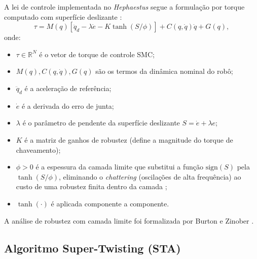 A lei de controle implementada no \textit{Hephaestus} segue a formulação por torque computado com superfície deslizante \cite{slotine1991applied}:
\begin{equation}
    \tau = M(q)\left[\ddot{q}_d - \lambda\dot{e} - K \tanh(S/\phi)\right] + C(q,\dot{q})\dot{q} + G(q),
    \label{eq:smc}
\end{equation}
onde:
\begin{itemize}
    \item $\tau \in \mathbb{R}^{N}$ é o vetor de torque de controle SMC;
    \item $M(q), C(q,\dot{q}), G(q)$ são os termos da dinâmica nominal do robô;
    \item $\ddot{q}_d$ é a aceleração de referência;
    \item $\dot{e}$ é a derivada do erro de junta;
    \item $\lambda$ é o parâmetro de pendente da superfície deslizante $S = \dot{e} + \lambda e$;
    \item $K$ é a matriz de ganhos de robustez (define a magnitude do torque de chaveamento);
    \item $\phi > 0$ é a espessura da camada limite que substitui a função $\text{sign}(S)$ pela $\tanh(S/\phi)$, eliminando o \textit{chattering} (oscilações de alta frequência) ao custo de uma robustez finita dentro da camada \cite{slotine1991applied, edwards1998sliding};
    \item $\tanh(\cdot)$ é aplicada componente a componente.
\end{itemize} A análise de robustez com camada limite foi formalizada por Burton e Zinober \cite{burton1986continuous}.

\subsection{Algoritmo Super-Twisting (STA)}

